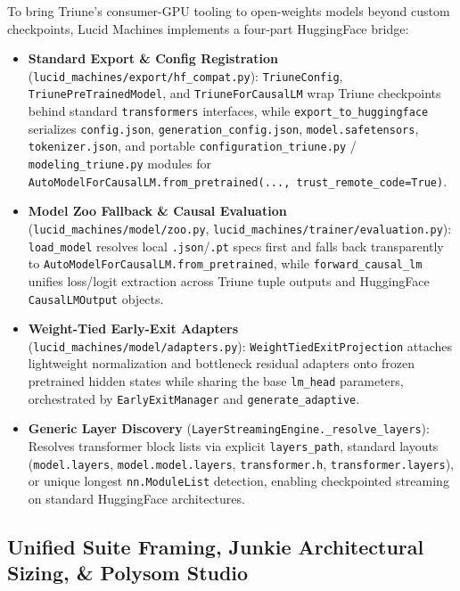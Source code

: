 \documentclass[10pt,twocolumn,letterpaper]{article}
\begin{document}
To bring Triune's consumer-GPU tooling to open-weights models beyond custom checkpoints, Lucid Machines implements a four-part HuggingFace bridge:
\begin{itemize}
    \item \textbf{Standard Export \& Config Registration} (\texttt{lucid\_machines/export/hf\_compat.py}): \texttt{TriuneConfig}, \texttt{TriunePreTrainedModel}, and \texttt{TriuneForCausalLM} wrap Triune checkpoints behind standard \texttt{transformers} interfaces, while \texttt{export\_to\_huggingface} serializes \texttt{config.json}, \texttt{generation\_config.json}, \texttt{model.safetensors}, \texttt{tokenizer.json}, and portable \texttt{configuration\_triune.py} / \texttt{modeling\_triune.py} modules for \texttt{AutoModelForCausalLM.from\_pretrained(..., trust\_remote\_code=True)}.
    \item \textbf{Model Zoo Fallback \& Causal Evaluation} (\texttt{lucid\_machines/model/zoo.py}, \texttt{lucid\_machines/trainer/evaluation.py}): \texttt{load\_model} resolves local \texttt{.json}/\texttt{.pt} specs first and falls back transparently to \texttt{AutoModelForCausalLM.from\_pretrained}, while \texttt{forward\_causal\_lm} unifies loss/logit extraction across Triune tuple outputs and HuggingFace \texttt{CausalLMOutput} objects.
    \item \textbf{Weight-Tied Early-Exit Adapters} (\texttt{lucid\_machines/model/adapters.py}): \texttt{WeightTiedExitProjection} attaches lightweight normalization and bottleneck residual adapters onto frozen pretrained hidden states while sharing the base \texttt{lm\_head} parameters, orchestrated by \texttt{EarlyExitManager} and \texttt{generate\_adaptive}.
    \item \textbf{Generic Layer Discovery} (\texttt{LayerStreamingEngine.\_resolve\_layers}): Resolves transformer block lists via explicit \texttt{layers\_path}, standard layouts (\texttt{model.layers}, \texttt{model.model.layers}, \texttt{transformer.h}, \texttt{transformer.layers}), or unique longest \texttt{nn.ModuleList} detection, enabling checkpointed streaming on standard HuggingFace architectures.
\end{itemize}

\subsection{Unified Suite Framing, Junkie Architectural Sizing, \& Polysom Studio}
\label{sec:suite_junkie}
\end{document}
